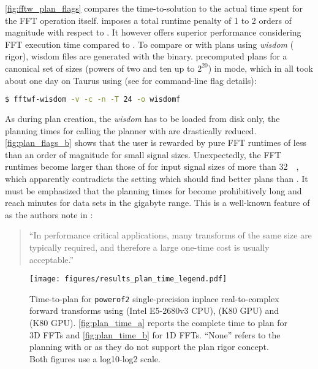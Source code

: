 \cref{fig:fftw_plan_flags} compares the time-to-solution to the actual time spent for the FFT operation itself.  imposes a total runtime penalty of 1 to 2 orders of magnitude with respect to . It however offers superior performance considering FFT execution time compared to . To compare  or  with plans using \emph{wisdom} ( rigor), wisdom files are generated with the  binary.  precomputed plans for a canonical set of sizes (powers of two and ten up to $2^{20}$) in  mode, which in all took about one day on Taurus \cite{taurus} using (see \cite{fftw_manual} for command-line flag details):
\begin{lstlisting}[language=bash]
$ fftwf-wisdom -v -c -n -T 24 -o wisdomf
\end{lstlisting}%

As during plan creation, the \emph{wisdom} has to be loaded from disk only, the planning times for calling the planner with  are drastically reduced. \cref{fig:plan_flags_b} shows that the user is rewarded by pure FFT runtimes of less than an order of magnitude for small signal sizes. Unexpectedly, the FFT runtimes become larger than those of  for input signal sizes of more than \SI{32}{\kibi\byte}, which apparently contradicts the  setting which should find better plans than .
%
It must be emphasized that the planning times for  become prohibitively long and reach minutes for data sets in the gigabyte range. This is a well-known feature of \fftw{} as the authors note in \cite{FFTW05}:
%
\begin{quote}
  ``In performance critical applications, many transforms of the same
  size are typically required, and therefore a large one-time cost is
  usually acceptable.''
\end{quote}

\begin{figure}[!tbp]
  \centering
  \texttt{[image: figures/results\_plan\_time\_legend.pdf]}\vspace{-1em}
  \hfill
  \caption{Time-to-plan for \texttt{powerof2} single-precision inplace real-to-complex forward transforms using \fftw{} (Intel E5-2680v3 CPU), \cufft{} (K80 GPU) and \clfft{} (K80 GPU). \cref{fig:plan_time_a} reports the complete time to plan for 3D FFTs and \cref{fig:plan_time_b} for 1D FFTs. ``None'' refers to the planning with \cufft{} or \clfft{} as they do not support the plan rigor concept. Both figures use a log10-log2 scale.}
  \label{fig:plan_time}
\end{figure}

